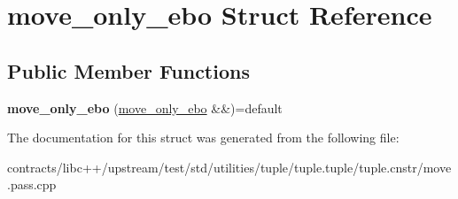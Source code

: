 \hypertarget{structmove__only__ebo}{}\section{move\+\_\+only\+\_\+ebo Struct Reference}
\label{structmove__only__ebo}
\subsection*{Public Member Functions}
\begin{DoxyCompactItemize}
\item 
\mbox{\label{structmove__only__ebo_a382956bb60f3229ccc0fdd1d8ebca5ce}} 
{\bfseries move\+\_\+only\+\_\+ebo} (\mbox{\hyperlink{structmove__only__ebo}{move\+\_\+only\+\_\+ebo}} \&\&)=default
\end{DoxyCompactItemize}


The documentation for this struct was generated from the following file\+:\begin{DoxyCompactItemize}
\item 
contracts/libc++/upstream/test/std/utilities/tuple/tuple.\+tuple/tuple.\+cnstr/move.\+pass.\+cpp\end{DoxyCompactItemize}
